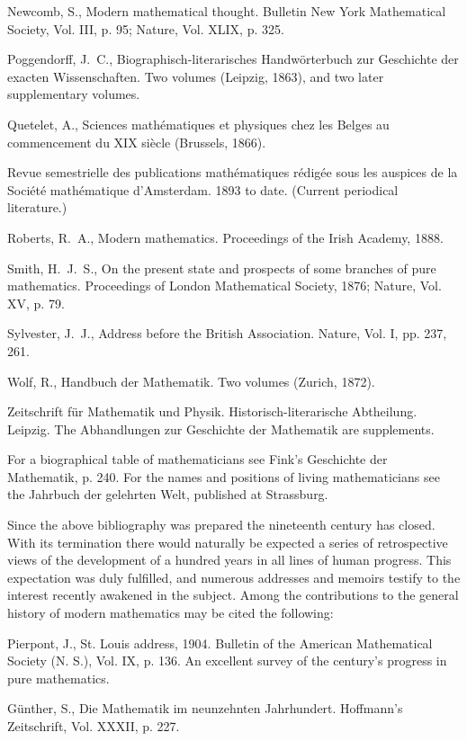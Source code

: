 \documentclass[oneside]{book}
\begin{document}
{Newcomb, S., Modern mathematical thought. Bulletin New York
Mathematical Society, Vol. III, p. 95; Nature, Vol. XLIX, p. 325.

Poggendorff, J.~C., Biographisch-literarisches Handw\"orterbuch
zur Ge\-schi\-chte der exacten Wissenschaften. Two volumes (Leipzig,
1863), and two later supplementary volumes.

Quetelet, A., Sciences math\'ematiques et physiques chez les Belges
au commencement du XIX si\`ecle (Brussels, 1866).

Revue semestrielle des publications math\'ematiques r\'edig\'ee sous
les auspices de la Soci\'et\'e math\'ematique d'Amsterdam. 1893 to
date. (Current periodical literature.)

Roberts, R.~A., Modern mathematics. Proceedings of the Irish
Academy, 1888.

Smith, H.~J.~S., On the present state and prospects of some branches
of pure mathematics. Proceedings of London Mathematical Society,
1876; Nature, Vol. XV, p. 79.

Sylvester, J.~J., Address before the British Association. Nature,
Vol. I, pp. 237, 261.

Wolf, R., Handbuch der Mathematik. Two volumes (Zurich, 1872).

Zeitschrift f\"ur Mathematik und Physik. Historisch-literarische
Abtheilung. Leipzig. The Abhandlungen zur Geschichte der Mathematik
are supplements.

\bigskip

For a biographical table of mathematicians see Fink's Geschichte der
Mathematik, p. 240. For the names and positions of living
mathematicians see the Jahrbuch der gelehrten Welt, published at
Strassburg.

Since the above bibliography was prepared the nineteenth century has
closed. With its termination there would naturally be expected a
series of retrospective views of the development of a hundred years
in all lines of human progress. This expectation was duly
fulfilled, and numerous addresses and memoirs testify to the
interest recently awakened in the subject. Among the contributions
to the general history of modern mathematics may be cited the
following:

\bigskip
Pierpont, J., St. Louis address, 1904. Bulletin of the American
Mathematical Society (N. S.), Vol. IX, p. 136. An excellent survey
of the century's progress in pure mathematics.

G\"unther, S., Die Mathematik im neunzehnten Jahrhundert. Hoffmann's
Zeitschrift, Vol. XXXII, p. 227.

}
\end{document}
